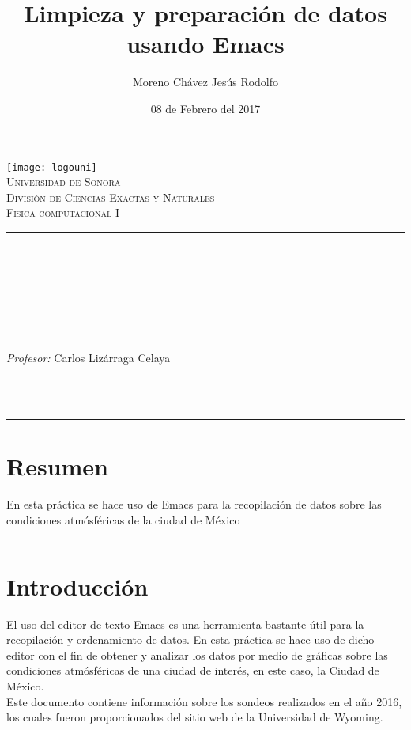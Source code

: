 \documentclass[12pt]{article}
\title{Limpieza y preparación de datos usando Emacs}		%
\author{\centering Moreno Chávez Jesús Rodolfo}											%
\date{08 de Febrero del 2017} %
\makeatletter
\let\thetitle\@title
\let\theauthor\@author
\let\thedate\@date
\makeatother
\begin{document}

\begin{titlepage}
	\centering
    \vspace*{0.5 cm}
    \texttt{[image: logouni]}\\[0.5 cm]	%
    \textsc{\Large Universidad de Sonora}\\[1.0 cm]	%
	\textsc{\Large División de Ciencias Exactas y Naturales}\\[0.5 cm]				%
	\textsc{\large Física computacional I}\\[0.5 cm]				%
	\rule{\linewidth}{0.2 mm} \\[0.4 cm]
	{ \huge \bfseries \thetitle}\\
	\rule{\linewidth}{0.2 mm} \\[0.5 cm]
	
	\begin{minipage}{\textwidth}
		\begin{flushleft} 
			\emph{\Large} \large \\
			\theauthor
			\end{flushleft}
	
		\begin{flushleft} 
			\emph{\Large Profesor:} \large \centering Carlos Lizárraga Celaya 	
			\end{flushleft}
	\end{minipage}\\[1 cm]
	{\large \thedate}\\[2 cm]
 
	\vfill
	
\end{titlepage}
\newpage
\hrule 
\section*{Resumen}
En esta práctica se hace uso de Emacs para la recopilación de datos sobre las condiciones atmósféricas de la ciudad de México
\vspace{0.5 cm}
\hrule
\vspace{0.9 cm}
\section*{Introducción}
El uso del editor de texto Emacs es una herramienta bastante útil para la recopilación y ordenamiento de datos. En esta práctica se hace uso de dicho editor con el fin de obtener y analizar los datos por medio de gráficas sobre las condiciones atmósféricas de una ciudad de interés, en este caso, la Ciudad de México. \\ Este documento contiene información sobre los sondeos realizados en el año 2016, los cuales fueron proporcionados del sitio web de la Universidad de Wyoming. 
\end{document}
